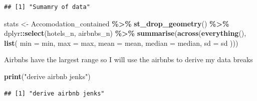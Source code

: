 \documentclass[
]{article}
\newenvironment{Shaded}{\begin{snugshade}}{\end{snugshade}}
\newcommand{\AttributeTok}[1]{\textcolor[rgb]{0.13,0.29,0.53}{#1}}
\newcommand{\CommentTok}[1]{\textcolor[rgb]{0.56,0.35,0.01}{\textit{#1}}}
\newcommand{\DecValTok}[1]{\textcolor[rgb]{0.00,0.00,0.81}{#1}}
\newcommand{\FunctionTok}[1]{\textcolor[rgb]{0.13,0.29,0.53}{\textbf{#1}}}
\newcommand{\NormalTok}[1]{#1}
\newcommand{\OtherTok}[1]{\textcolor[rgb]{0.56,0.35,0.01}{#1}}
\newcommand{\SpecialCharTok}[1]{\textcolor[rgb]{0.81,0.36,0.00}{\textbf{#1}}}
\newcommand{\StringTok}[1]{\textcolor[rgb]{0.31,0.60,0.02}{#1}}
\begin{document}
\begin{verbatim}
## [1] "Sumamry of data"
\end{verbatim}

\begin{Shaded}
\begin{Highlighting}[]
\NormalTok{stats }\OtherTok{\textless{}{-}}\NormalTok{ Accomodation\_contained }\SpecialCharTok{\%\textgreater{}\%}
  \FunctionTok{st\_drop\_geometry}\NormalTok{() }\SpecialCharTok{\%\textgreater{}\%}
\NormalTok{  dplyr}\SpecialCharTok{::}\FunctionTok{select}\NormalTok{(hotels\_n, airbnbs\_n) }\SpecialCharTok{\%\textgreater{}\%}  
  \FunctionTok{summarise}\NormalTok{(}\FunctionTok{across}\NormalTok{(}\FunctionTok{everything}\NormalTok{(), }\FunctionTok{list}\NormalTok{(}
    \AttributeTok{min =}\NormalTok{ min,}
    \AttributeTok{max =}\NormalTok{ max,}
    \AttributeTok{mean =}\NormalTok{ mean,}
    \AttributeTok{median =}\NormalTok{ median,}
    \AttributeTok{sd =}\NormalTok{ sd}
\NormalTok{  )))}
\end{Highlighting}
\end{Shaded}

Airbnbs have the largest range so I will use the airbnbs to derive my
data breaks

\begin{Shaded}
\begin{Highlighting}[]
\FunctionTok{print}\NormalTok{(}\StringTok{"derive airbnb jenks"}\NormalTok{)}
\end{Highlighting}
\end{Shaded}

\begin{verbatim}
## [1] "derive airbnb jenks"
\end{verbatim}

\begin{Shaded}
\end{Shaded}
\end{document}
